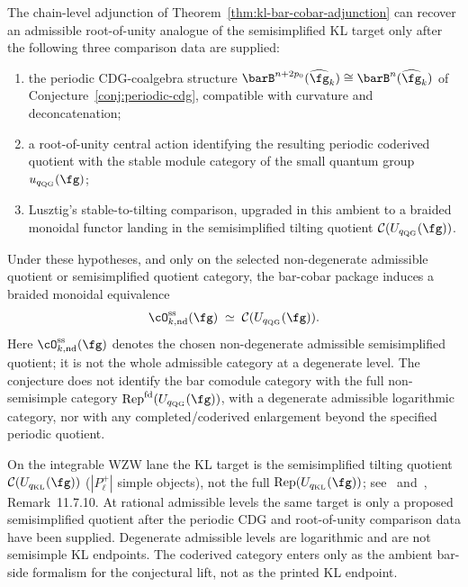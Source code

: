\begin{conjecture}
\label{conj:kl-bar-cobar-dl}
The chain-level adjunction of
Theorem~\textup{\ref{thm:kl-bar-cobar-adjunction}} can recover an
admissible root-of-unity analogue of the semisimplified KL target only
after the following three comparison data are supplied:
\begin{enumerate}[label=\textup{(\arabic*)}]
\item the periodic CDG-coalgebra structure
 $\barB^{n+2p_0}(\widehat{\fg}_k)\cong\barB^n(\widehat{\fg}_k)$ of
 Conjecture~\ref{conj:periodic-cdg}, compatible with curvature and
 deconcatenation;
\item a root-of-unity central action identifying the resulting
 periodic coderived quotient with the stable module category of the
 small quantum group $u_{q_{\mathrm{QG}}}(\fg)$;
\item Lusztig's stable-to-tilting comparison, upgraded in this
 ambient to a braided monoidal functor landing in the semisimplified
 tilting quotient $\mathcal C(U_{q_{\mathrm{QG}}}(\fg))$.
\end{enumerate}
Under these hypotheses, and only on the selected non-degenerate
admissible quotient or semisimplified quotient category, the bar-cobar
package induces a braided monoidal equivalence
\[
\cO_{k,\mathrm{nd}}^{\mathrm{ss}}(\fg)
\;\simeq\;
\mathcal C(U_{q_{\mathrm{QG}}}(\fg)).
\]
Here $\cO_{k,\mathrm{nd}}^{\mathrm{ss}}(\fg)$ denotes the chosen
non-degenerate admissible semisimplified quotient; it is not the whole
admissible category at a degenerate level.
The conjecture does not identify the bar comodule category with the
full non-semisimple category $\mathrm{Rep}^{\mathrm{fd}}(U_{q_{\mathrm{QG}}}(\fg))$,
with a degenerate admissible logarithmic category, nor with any
completed/coderived enlargement beyond the specified periodic quotient.
\end{conjecture}

\begin{remark}\label{rem:kl-target-category}
On the integrable WZW lane the KL target is the semisimplified tilting
quotient $\mathcal{C}(U_{q_{\mathrm{KL}}}(\fg))$ ($|P_\ell^+|$ simple objects), not
the full $\mathrm{Rep}(U_{q_{\mathrm{KL}}}(\fg))$; see~\cite{BK01} and~\cite{EGNO},
Remark~11.7.10. At rational admissible levels the same target is only
a proposed semisimplified quotient after the periodic CDG and
root-of-unity comparison data have been supplied. Degenerate
admissible levels are logarithmic and are not semisimple KL endpoints.
The coderived category enters only as the ambient bar-side formalism
for the conjectural lift, not as the printed KL endpoint.
\end{remark}

